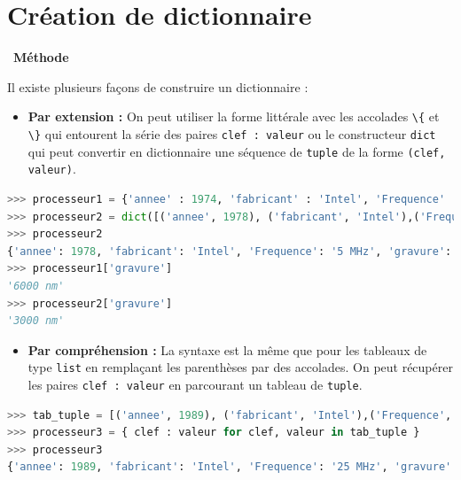 \documentclass[
  11pt,
]{article}
\newcommand{\passthrough}[1]{#1}
\providecommand{\tightlist}{%
  \setlength{\itemsep}{0pt}\setlength{\parskip}{0pt}}
\newenvironment{methode}[1]
{\par \medskip    \noindent  
 \begin {bclogo}[arrondi =0.1,logo=\bcoutil, marge=4,noborder = true] {~\textbf{Méthode}   {\itshape #1} }  \par}
{
\end{bclogo}
 \par \bigskip }
\begin{document}
\hypertarget{cruxe9ation-de-dictionnaire}{%
\section{Création de dictionnaire}\label{cruxe9ation-de-dictionnaire}}

\begin{methode}{}

Il existe plusieurs façons de construire un dictionnaire :

\begin{itemize}
\tightlist
\item
  \textbf{Par extension :} On peut utiliser la forme littérale avec les
  accolades \passthrough{\lstinline!\{!} et \passthrough{\lstinline!\}!}
  qui entourent la série des paires
  \passthrough{\lstinline!clef : valeur!} ou le constructeur
  \passthrough{\lstinline!dict!} qui peut convertir en dictionnaire une
  séquence de \passthrough{\lstinline!tuple!} de la forme
  \passthrough{\lstinline!(clef, valeur)!}.
\end{itemize}

\begin{lstlisting}[language=Python]
>>> processeur1 = {'annee' : 1974, 'fabricant' : 'Intel', 'Frequence' : '2 MHz','gravure' : '6000 nm', 'architecture' : '8080'}
>>> processeur2 = dict([('annee', 1978), ('fabricant', 'Intel'),('Frequence','5 MHz'),('gravure','3 micrometres'),('architecture','8086')])
>>> processeur2
{'annee': 1978, 'fabricant': 'Intel', 'Frequence': '5 MHz', 'gravure': '3000 nm', 'architecture': '8086'}
>>> processeur1['gravure']
'6000 nm'
>>> processeur2['gravure']
'3000 nm'
\end{lstlisting}

\begin{itemize}
\tightlist
\item
  \textbf{Par compréhension :} La syntaxe est la même que pour les
  tableaux de type \passthrough{\lstinline!list!} en remplaçant les
  parenthèses par des accolades. On peut récupérer les paires
  \passthrough{\lstinline!clef : valeur!} en parcourant un tableau de
  \passthrough{\lstinline!tuple!}.
\end{itemize}

\begin{lstlisting}[language=Python]
>>> tab_tuple = [('annee', 1989), ('fabricant', 'Intel'),('Frequence','25 MHz'),('gravure','600 nm'),('architecture','80486')]
>>> processeur3 = { clef : valeur for clef, valeur in tab_tuple }
>>> processeur3
{'annee': 1989, 'fabricant': 'Intel', 'Frequence': '25 MHz', 'gravure': '600 nm', 'architecture': '80486'}
\end{lstlisting}

\end{methode}
\end{document}
